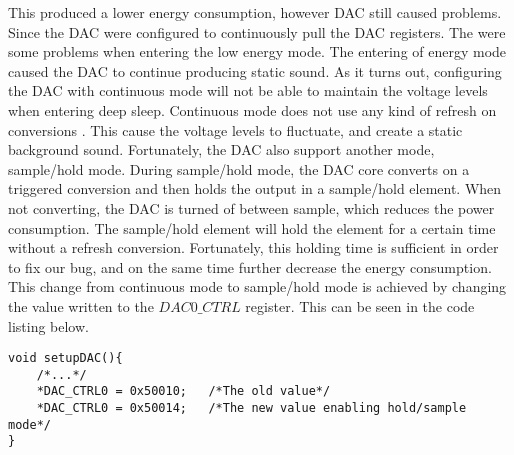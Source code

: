 This produced a lower energy consumption, however DAC still caused problems. Since the DAC were configured to continuously pull the DAC registers. The were some problems when entering the low energy mode. The entering of energy mode caused the DAC to continue producing static sound. As it turns out, configuring the DAC with continuous mode will not be able to maintain the voltage levels when entering deep sleep. Continuous mode does not use any kind of refresh on conversions \cite{EFM32GG-rm}. This cause the voltage levels to fluctuate, and create a static background sound. Fortunately, the DAC also support another mode, sample/hold mode. During sample/hold mode, the DAC core converts on a triggered conversion and then holds the output in a sample/hold element. When not converting, the DAC is turned of between sample, which reduces the power consumption. The sample/hold element will hold the element for a certain time without a refresh conversion\cite{EFM32GG-rm}. Fortunately, this holding time is sufficient in order to fix our bug, and on the same time further decrease the energy consumption. This change from continuous mode to sample/hold mode is achieved by changing the value written to the $DAC0\_CTRL$ register. This can be seen in the code listing below. 


\begin{lstlisting}
void setupDAC(){
    /*...*/
    *DAC_CTRL0 = 0x50010;   /*The old value*/
    *DAC_CTRL0 = 0x50014;   /*The new value enabling hold/sample mode*/
}
\end{lstlisting}


   



  
       

 



